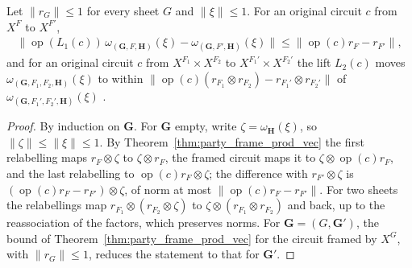 \begin{theorem}
    \label{thm:party_stack_lift_error}
    \leanok
    Let $\lVert r_G\rVert\leq1$ for every sheet $G$ and $\lVert\xi\rVert\leq1$. For an original
    circuit $c$ from $X^F$ to $X^{F'}$,
    \begin{align}
        \bigl\lVert\operatorname{op}(L_1(c))\,\omega_{(\mathbf G,F,\mathbf H)}(\xi)
        -\omega_{(\mathbf G,F',\mathbf H)}(\xi)\bigr\rVert
        \leq\lVert\operatorname{op}(c)r_F-r_{F'}\rVert,
    \end{align}
    and for an original circuit $c$ from $X^{F_1}\times X^{F_2}$ to $X^{F_1'}\times X^{F_2'}$ the
    lift $L_2(c)$ moves $\omega_{(\mathbf G,F_1,F_2,\mathbf H)}(\xi)$ to within
    $\lVert\operatorname{op}(c)(r_{F_1}\otimes r_{F_2})-r_{F_1'}\otimes r_{F_2'}\rVert$ of
    $\omega_{(\mathbf G,F_1',F_2',\mathbf H)}(\xi)$ \cite[Proposition~7.1]{OpenAI2026PolynomialPEPS}.
\end{theorem}
\begin{proof}\leanok
    By induction on $\mathbf G$. For $\mathbf G$ empty, write $\zeta=\omega_{\mathbf H}(\xi)$, so
    $\lVert\zeta\rVert\leq\lVert\xi\rVert\leq1$. By Theorem~\ref{thm:party_frame_prod_vec} the first
    relabelling maps $r_F\otimes\zeta$ to $\zeta\otimes r_F$, the framed circuit maps it to
    $\zeta\otimes\operatorname{op}(c)r_F$, and the last relabelling to
    $\operatorname{op}(c)r_F\otimes\zeta$; the difference with $r_{F'}\otimes\zeta$ is
    $(\operatorname{op}(c)r_F-r_{F'})\otimes\zeta$, of norm at most
    $\lVert\operatorname{op}(c)r_F-r_{F'}\rVert$. For two sheets the relabellings map
    $r_{F_1}\otimes(r_{F_2}\otimes\zeta)$ to $\zeta\otimes(r_{F_1}\otimes r_{F_2})$ and back, up to
    the reassociation of the factors, which preserves norms. For $\mathbf G=(G,\mathbf G')$, the
    bound of Theorem~\ref{thm:party_frame_prod_vec} for the circuit framed by $X^G$, with
    $\lVert r_G\rVert\leq1$, reduces the statement to that for $\mathbf G'$.
\end{proof}

